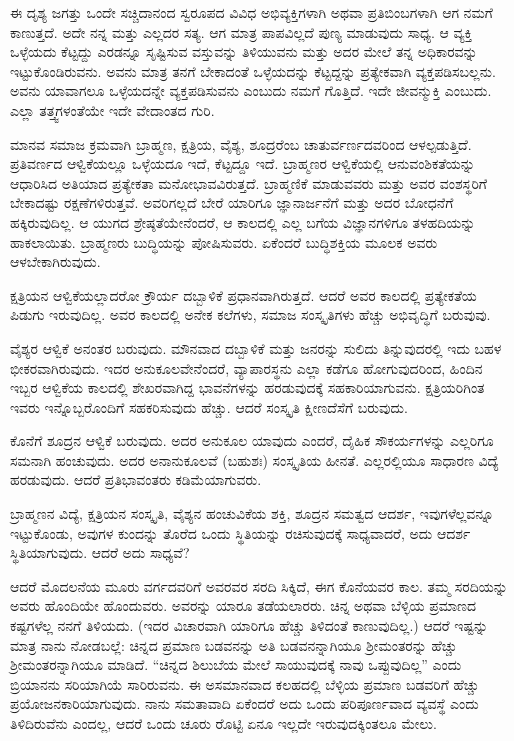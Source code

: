 ಈ ದೃಶ್ಯ ಜಗತ್ತು ಒಂದೇ ಸಚ್ಚಿದಾನಂದ ಸ್ವರೂಪದ ವಿವಿಧ ಅಭಿವ್ಯಕ್ತಿಗಳಾಗಿ ಅಥವಾ ಪ್ರತಿಬಿಂಬಗಳಾಗಿ ಆಗ ನಮಗೆ ಕಾಣುತ್ತದೆ. ಅದೇ ನನ್ನ ಮತ್ತು ಎಲ್ಲದರ ಸತ್ಯ. ಆಗ ಮಾತ್ರ ಪಾಪವಿಲ್ಲದೆ ಪುಣ್ಯ ಮಾಡುವುದು ಸಾಧ್ಯ. ಆ ವ್ಯಕ್ತಿ ಒಳ್ಳೆಯದು ಕೆಟ್ಟದ್ದು ಎರಡನ್ನೂ ಸೃಷ್ಟಿಸುವ ವಸ್ತುವನ್ನು ತಿಳಿಯುವನು ಮತ್ತು ಅದರ ಮೇಲೆ ತನ್ನ ಅಧಿಕಾರವನ್ನು ಇಟ್ಟುಕೊಂಡಿರುವನು. ಅವನು ಮಾತ್ರ ತನಗೆ ಬೇಕಾದಂತೆ ಒಳ್ಳೆಯದನ್ನು ಕೆಟ್ಟದ್ದನ್ನು ಪ್ರತ್ಯೇಕವಾಗಿ ವ್ಯಕ್ತಪಡಿಸಬಲ್ಲನು. ಅವನು ಯಾವಾಗಲೂ ಒಳ್ಳೆಯದನ್ನೇ ವ್ಯಕ್ತಪಡಿಸುವನು ಎಂಬುದು ನಮಗೆ ಗೊತ್ತಿದೆ. ಇದೇ ಜೀವನ್ಮುಕ್ತಿ ಎಂಬುದು. ಎಲ್ಲಾ ತತ್ತ್ವಗಳಂತೆಯೇ ಇದೇ ವೇದಾಂತದ ಗುರಿ.

ಮಾನವ ಸಮಾಜ ಕ್ರಮವಾಗಿ ಬ್ರಾಹ್ಮಣ, ಕ್ಷತ್ರಿಯ, ವೈಶ್ಯ, ಶೂದ್ರರೆಂಬ ಚಾತುರ್ವರ್ಣದವರಿಂದ ಆಳಲ್ಪಡುತ್ತಿದೆ. ಪ್ರತಿವರ್ಣದ ಆಳ್ವಿಕೆಯಲ್ಲೂ ಒಳ್ಳೆಯದೂ ಇದೆ, ಕೆಟ್ಟದ್ದೂ ಇದೆ. ಬ್ರಾಹ್ಮಣರ ಆಳ್ವಿಕೆಯಲ್ಲಿ ಆನುವಂಶಿಕತೆಯನ್ನು ಆಧಾರಿಸಿದ ಅತಿಯಾದ ಪ್ರತ್ಯೇಕತಾ ಮನೋಭಾವವಿರುತ್ತದೆ. ಬ್ರಾಹ್ಮಣಿಕೆ ಮಾಡುವವರು ಮತ್ತು ಅವರ ವಂಶಸ್ಥರಿಗೆ ಬೇಕಾದಷ್ಟು ರಕ್ಷಣೆಗಳಿರುತ್ತವೆ. ಅವರಿಗಲ್ಲದೆ ಬೇರೆ ಯಾರಿಗೂ ಜ್ಞಾನಾರ್ಜನೆಗೆ ಮತ್ತು ಅದರ ಬೋಧನೆಗೆ ಹಕ್ಕಿರುವುದಿಲ್ಲ. ಆ ಯುಗದ ಶ್ರೇಷ್ಠತೆಯೇನೆಂದರೆ, ಆ ಕಾಲದಲ್ಲಿ ಎಲ್ಲ ಬಗೆಯ ವಿಜ್ಞಾನಗಳಿಗೂ ತಳಹದಿಯನ್ನು ಹಾಕಲಾಯಿತು. ಬ್ರಾಹ್ಮಣರು ಬುದ್ಧಿಯನ್ನು ಪೋಷಿಸುವರು. ಏಕೆಂದರೆ ಬುದ್ಧಿಶಕ್ತಿಯ ಮೂಲಕ ಅವರು ಆಳಬೇಕಾಗಿರುವುದು.

ಕ್ಷತ್ರಿಯನ ಆಳ್ವಿಕೆಯಲ್ಲಾದರೋ ಕ್ರೌರ್ಯ ದಬ್ಬಾಳಿಕೆ ಪ್ರಧಾನವಾಗಿರುತ್ತದೆ. ಆದರೆ ಅವರ ಕಾಲದಲ್ಲಿ ಪ್ರತ್ಯೇಕತೆಯ ಪಿಡುಗು ಇರುವುದಿಲ್ಲ. ಅವರ ಕಾಲದಲ್ಲಿ ಅನೇಕ ಕಲೆಗಳು, ಸಮಾಜ ಸಂಸ್ಕೃತಿಗಳು ಹೆಚ್ಚು ಅಭಿವೃದ್ಧಿಗೆ ಬರುವುವು.

ವೈಶ್ಯರ ಆಳ್ವಿಕೆ ಅನಂತರ ಬರುವುದು. ಮೌನವಾದ ದಬ್ಬಾಳಿಕೆ ಮತ್ತು ಜನರನ್ನು ಸುಲಿದು ತಿನ್ನುವುದರಲ್ಲಿ ಇದು ಬಹಳ ಭೀಕರವಾಗಿರುವುದು. ಇದರ ಅನುಕೂಲವೇನೆಂದರೆ, ವ್ಯಾಪಾರಸ್ಥನು ಎಲ್ಲಾ ಕಡೆಗೂ ಹೋಗುವುದರಿಂದ, ಹಿಂದಿನ ಇಬ್ಬರ ಆಳ್ವಿಕೆಯ ಕಾಲದಲ್ಲಿ ಶೇಖರವಾಗಿದ್ದ ಭಾವನೆಗಳನ್ನು ಹರಡುವುದಕ್ಕೆ ಸಹಕಾರಿಯಾಗುವನು. ಕ್ಷತ್ರಿಯರಿಗಿಂತ ಇವರು ಇನ್ನೊಬ್ಬರೊಂದಿಗೆ ಸಹಕರಿಸುವುದು ಹೆಚ್ಚು. ಆದರೆ ಸಂಸ್ಕೃತಿ ಕ್ಷೀಣದೆಸೆಗೆ ಬರುವುದು.

ಕೊನೆಗೆ ಶೂದ್ರನ ಆಳ್ವಿಕೆ ಬರುವುದು. ಅದರ ಅನುಕೂಲ ಯಾವುದು ಎಂದರೆ, ದೈಹಿಕ ಸೌಕರ್ಯಗಳನ್ನು ಎಲ್ಲರಿಗೂ ಸಮನಾಗಿ ಹಂಚುವುದು. ಅದರ ಅನಾನುಕೂಲವೆ (ಬಹುಶಃ) ಸಂಸ್ಕೃತಿಯ ಹೀನತೆ. ಎಲ್ಲರಲ್ಲಿಯೂ ಸಾಧಾರಣ ವಿದ್ಯೆ ಹರಡುವುದು. ಆದರೆ ಪ್ರತಿಭಾವಂತರು ಕಡಿಮೆಯಾಗುವರು.

\newpage

ಬ್ರಾಹ್ಮಣನ ವಿದ್ಯೆ, ಕ್ಷತ್ರಿಯನ ಸಂಸ್ಕೃತಿ, ವೈಶ್ಯನ ಹಂಚುವಿಕೆಯ ಶಕ್ತಿ, ಶೂದ್ರನ ಸಮತ್ವದ ಆದರ್ಶ, ಇವುಗಳೆಲ್ಲವನ್ನೂ ಇಟ್ಟುಕೊಂಡು, ಅವುಗಳ ಕುಂದನ್ನು ತೊರೆದ ಒಂದು ಸ್ಥಿತಿಯನ್ನು ರಚಿಸುವುದಕ್ಕೆ ಸಾಧ್ಯವಾದರೆ, ಅದು ಆದರ್ಶ ಸ್ಥಿತಿಯಾಗುವುದು. ಆದರೆ ಅದು ಸಾಧ್ಯವೆ?

\vspace{0.15cm}

ಆದರೆ ಮೊದಲನೆಯ ಮೂರು ವರ್ಗದವರಿಗೆ ಅವರವರ ಸರದಿ ಸಿಕ್ಕಿದೆ, ಈಗ ಕೊನೆಯವರ ಕಾಲ. ತಮ್ಮ ಸರದಿಯನ್ನು ಅವರು ಹೊಂದಿಯೇ ಹೊಂದುವರು. ಅವರನ್ನು ಯಾರೂ ತಡೆಯಲಾರರು. ಚಿನ್ನ ಅಥವಾ ಬೆಳ್ಳಿಯ ಪ್ರಮಾಣದ  ಕಷ್ಟಗಳೆಲ್ಲ ನನಗೆ ತಿಳಿಯದು. (ಇದರ ವಿಚಾರವಾಗಿ ಯಾರಿಗೂ ಹೆಚ್ಚು ತಿಳಿದಂತೆ ಕಾಣುವುದಿಲ್ಲ.) ಆದರೆ ಇಷ್ಟನ್ನು ಮಾತ್ರ ನಾನು ನೋಡಬಲ್ಲೆ: ಚಿನ್ನದ ಪ್ರಮಾಣ ಬಡವನನ್ನು ಅತಿ ಬಡವನನ್ನಾಗಿಯೂ ಶ‍್ರೀಮಂತರನ್ನು ಹೆಚ್ಚು ಶ‍್ರೀಮಂತರನ್ನಾಗಿಯೂ ಮಾಡಿದೆ. ``ಚಿನ್ನದ ಶಿಲುಬೆಯ ಮೇಲೆ ಸಾಯುವುದಕ್ಕೆ ನಾವು ಒಪ್ಪುವುದಿಲ್ಲ'' ಎಂದು ಬ್ರಿಯಾನನು ಸರಿಯಾಗಿಯೆ ಸಾರಿರುವನು. ಈ ಅಸಮಾನವಾದ ಕಲಹದಲ್ಲಿ ಬೆಳ್ಳಿಯ ಪ್ರಮಾಣ ಬಡವರಿಗೆ ಹೆಚ್ಚು ಪ್ರಯೋಜನಕಾರಿಯಾಗುವುದು. ನಾನು ಸಮತಾವಾದಿ  ಏಕೆಂದರೆ ಅದು ಒಂದು ಪರಿಪೂರ್ಣವಾದ ವ್ಯವಸ್ಥೆ ಎಂದು ತಿಳಿದಿರುವೆನು ಎಂದಲ್ಲ, ಆದರೆ ಒಂದು ಚೂರು ರೊಟ್ಟಿ ಏನೂ ಇಲ್ಲದೇ ಇರುವುದಕ್ಕಿಂತಲೂ ಮೇಲು.

